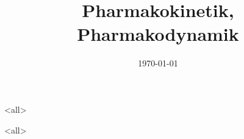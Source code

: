 \documentclass[ignorenonframetext]{beamer}
\title{Pharmakokinetik, Pharmakodynamik}
\subtitle{}
\author{}
\institute[Kantonsspital St.Gallen] {
  \inst{}
 }
\date[\today]{\today}
\begin{document}
\mode<all>

\mode<all>

\end{document}
